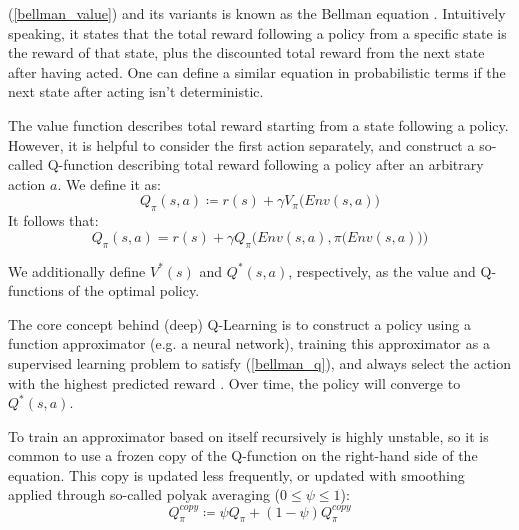 (\ref{bellman_value}) and its variants is known as the Bellman equation \cite{BellmanEq}. Intuitively speaking, it states that the total reward following a policy from a specific state is the reward of that state, plus the discounted total reward from the next state after having acted. One can define a similar equation in probabilistic terms if the next state after acting isn't deterministic.

The value function describes total reward starting from a state following a policy. However, it is helpful to consider the first action separately, and construct a so-called Q-function describing total reward following a policy after an arbitrary action $a$. We define it as:
\begin{equation}
    Q_{\pi}(s, a) \coloneqq r(s) + \gamma V_{\pi}\big(Env(s, a)\big)
\end{equation}
It follows that:
\begin{equation}
\label{bellman_q}
    Q_{\pi}(s, a) = r(s) + \gamma Q_{\pi}\Big(Env(s, a), \pi\big(Env(s, a)\big)\Big)
\end{equation}

We additionally define $V^*(s)$ and $Q^*(s, a)$, respectively, as the value and Q-functions of the optimal policy.

The core concept behind (deep) Q-Learning is to construct a policy using a function approximator (e.g. a neural network), training this approximator as a supervised learning problem to satisfy (\ref{bellman_q}), and always select the action with the highest predicted reward \cite{QlearningMnih}.
Over time, the policy will converge to $Q^*(s, a)$.\cite{Qlearn_convergence}

To train an approximator based on itself recursively is highly unstable, so it is common to use a frozen copy of the Q-function on the right-hand side of the equation. This copy is updated less frequently, or updated with smoothing applied through so-called polyak averaging ($0 \leq \psi \leq 1$):
\begin{equation}
    Q_{\pi}^{copy} \coloneqq \psi Q_{\pi} + (1 - \psi) Q_{\pi}^{copy}
\end{equation}

